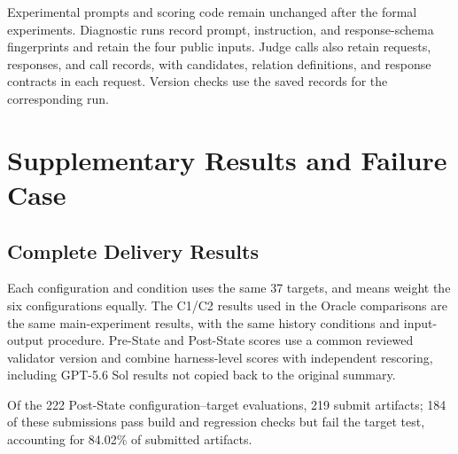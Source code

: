 \documentclass{article} %
\begin{document}
Experimental prompts and scoring code remain unchanged after the formal experiments. Diagnostic runs record prompt, instruction, and response-schema fingerprints and retain the four public inputs. Judge calls also retain requests, responses, and call records, with candidates, relation definitions, and response contracts in each request. Version checks use the saved records for the corresponding run.

\FloatBarrier
\section{Supplementary Results and Failure Case}
\label{app:e}

\FloatBarrier
\subsection{Complete Delivery Results}
\label{app:e1}

Each configuration and condition uses the same 37 targets, and means weight the six configurations equally. The C1/C2 results used in the Oracle comparisons are the same main-experiment results, with the same history conditions and input-output procedure. Pre-State and Post-State scores use a common reviewed validator version and combine harness-level scores with independent rescoring, including GPT-5.6 Sol results not copied back to the original summary.

Of the 222 Post-State configuration--target evaluations, 219 submit artifacts; 184 of these submissions pass build and regression checks but fail the target test, accounting for 84.02\% of submitted artifacts.
\end{document}
